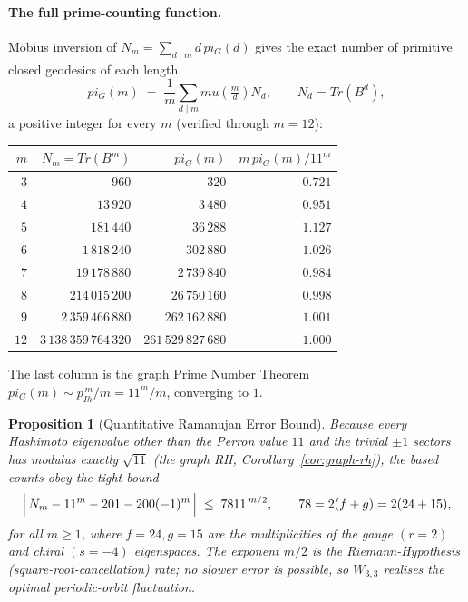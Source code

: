 \documentclass[12pt,a4paper]{article}
\def\mathrm#1{#1}%
\def\mu{mu}%
\def\pi{pi}%
\def\cdot{ }%
\newtheorem{proposition}[theorem]{Proposition}
\theoremstyle{definition}
\renewcommand{\Tr}{\mathrm{Tr}}
\begin{document}
\paragraph{The full prime-counting function.}
M\"obius inversion of $N_m=\sum_{d\mid m} d\,\pi_G(d)$ gives the exact
number of primitive closed geodesics of each length,
\[
\pi_G(m) \;=\; \frac1m \sum_{d\mid m}\mu\!\left(\tfrac{m}{d}\right) N_d,
\qquad N_d=\Tr(B^d),
\]
a positive integer for every $m$ (verified through $m=12$):
\begin{center}\small
\begin{tabular}{rrrr}
\toprule
$m$ & $N_m=\Tr(B^m)$ & $\pi_G(m)$ & $m\,\pi_G(m)/11^m$ \\
\midrule
$3$  & $960$              & $320$          & $0.721$ \\
$4$  & $13\,920$           & $3\,480$        & $0.951$ \\
$5$  & $181\,440$          & $36\,288$       & $1.127$ \\
$6$  & $1\,818\,240$        & $302\,880$      & $1.026$ \\
$7$  & $19\,178\,880$       & $2\,739\,840$    & $0.984$ \\
$8$  & $214\,015\,200$      & $26\,750\,160$   & $0.998$ \\
$9$  & $2\,359\,466\,880$    & $262\,162\,880$  & $1.001$ \\
$12$ & $3\,138\,359\,764\,320$ & $261\,529\,827\,680$ & $1.000$ \\
\bottomrule
\end{tabular}
\end{center}
The last column is the graph Prime Number Theorem
$\pi_G(m)\sim p_{\mathrm{Ih}}^{\,m}/m = 11^m/m$, converging to $1$.

\begin{proposition}[Quantitative Ramanujan Error Bound]
\label{prop:ramanujan-error}
Because every Hashimoto eigenvalue other than the Perron value $11$ and
the trivial $\pm1$ sectors has modulus exactly $\sqrt{11}$ (the graph RH,
Corollary~\ref{cor:graph-rh}), the based counts obey the tight bound
\[
\Bigl|\,N_m - 11^m - 201 - 200(-1)^m\,\Bigr|
\;\le\; 78\cdot 11^{\,m/2},
\qquad 78 = 2(f+g)=2(24+15),
\]
for all $m\ge1$, where $f=24,g=15$ are the multiplicities of the gauge
$(r=2)$ and chiral $(s=-4)$ eigenspaces.  The exponent $m/2$ is the
Riemann-Hypothesis (square-root-cancellation) rate; no slower error is
possible, so $W_{3,3}$ realises the optimal periodic-orbit fluctuation.
\end{proposition}
\end{document}
